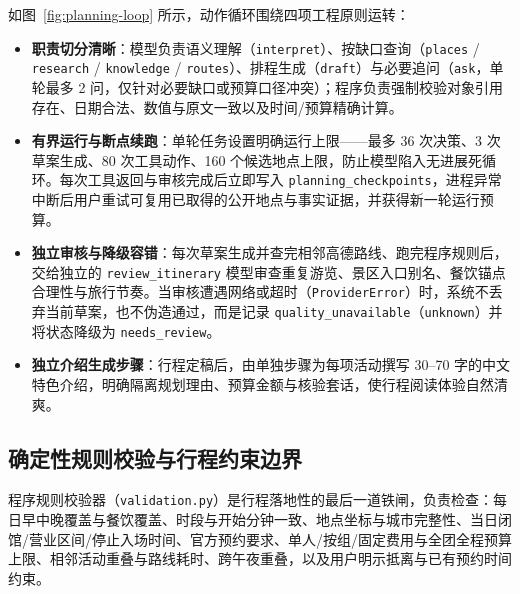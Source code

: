 如图~\ref{fig:planning-loop} 所示，动作循环围绕四项工程原则运转：

\begin{itemize}
  \item \textbf{职责切分清晰}：模型负责语义理解（\texttt{interpret}）、按缺口查询（\texttt{places} / \texttt{research} / \texttt{knowledge} / \texttt{routes}）、排程生成（\texttt{draft}）与必要追问（\texttt{ask}，单轮最多 2 问，仅针对必要缺口或预算口径冲突）；程序负责强制校验对象引用存在、日期合法、数值与原文一致以及时间/预算精确计算。
  \item \textbf{有界运行与断点续跑}：单轮任务设置明确运行上限——最多 36 次决策、3 次草案生成、80 次工具动作、160 个候选地点上限，防止模型陷入无进展死循环。每次工具返回与审核完成后立即写入 \texttt{planning\_checkpoints}，进程异常中断后用户重试可复用已取得的公开地点与事实证据，并获得新一轮运行预算。
  \item \textbf{独立审核与降级容错}：每次草案生成并查完相邻高德路线、跑完程序规则后，交给独立的 \texttt{review\_itinerary} 模型审查重复游览、景区入口别名、餐饮锚点合理性与旅行节奏。当审核遭遇网络或超时（\texttt{ProviderError}）时，系统不丢弃当前草案，也不伪造通过，而是记录 \texttt{quality\_unavailable}（\texttt{unknown}）并将状态降级为 \texttt{needs\_review}。
  \item \textbf{独立介绍生成步骤}：行程定稿后，由单独步骤为每项活动撰写 30--70 字的中文特色介绍，明确隔离规划理由、预算金额与核验套话，使行程阅读体验自然清爽。
\end{itemize}

\subsection{确定性规则校验与行程约束边界}

程序规则校验器（\texttt{validation.py}）是行程落地性的最后一道铁闸，负责检查：每日早中晚覆盖与餐饮覆盖、时段与开始分钟一致、地点坐标与城市完整性、当日闭馆/营业区间/停止入场时间、官方预约要求、单人/按组/固定费用与全团全程预算上限、相邻活动重叠与路线耗时、跨午夜重叠，以及用户明示抵离与已有预约时间约束。

